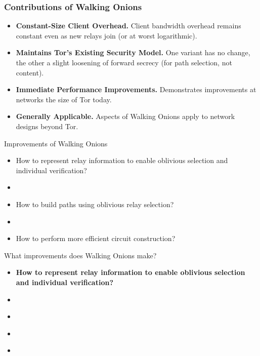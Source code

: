\documentclass[hyperref={pdfpagelabels=true},table,dvipsnames,14pt,aspectratio=169]{beamer}
\begin{document}
\begin{frame}
\frametitle{Contributions of Walking Onions}
  \begin{itemize}
  \setlength\itemsep{2ex}
    \item<1-> \textbf{Constant-Size Client Overhead.} Client bandwidth overhead
      remains constant even as new relays join (or at worst logarithmic).
    \item<2-> \textbf{Maintains Tor's Existing Security Model.} One variant has no change,
      the other a slight loosening of forward secrecy (for path
      selection, not content).
    \item<3-> \textbf{Immediate Performance Improvements.} Demonstrates
      improvements at networks the size of Tor today.
    \item<4-> \textbf{Generally Applicable.} Aspects of Walking
      Onions apply to network designs beyond Tor.
  \end{itemize}
\end{frame}

\begin{frame}{Improvements of Walking Onions}
  \begin{itemize}
    \item<1-> How to represent relay information to enable oblivious
      selection and individual verification?
    \item<2->[]~
    \item<2-> How to build paths using oblivious relay selection?
    \item<2->[]~
    \item<3-> How to perform more efficient circuit construction?
  \end{itemize}
\end{frame}

\begin{frame}{What improvements does Walking Onions make?}
  \begin{itemize}
    \item<1-> \textbf{How to represent relay information to enable oblivious
      selection and individual verification?}
    \item<1->[]~
    \item<1->[]~
    \item<1->[]~
    \item<1->[]~
  \end{itemize}
\end{frame}
\end{document}
